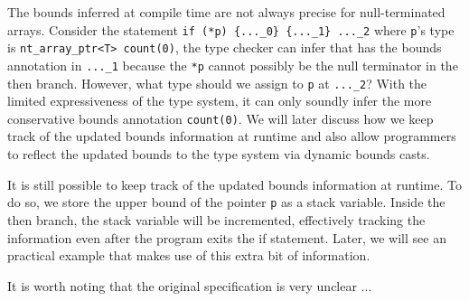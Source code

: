 
The bounds inferred at compile time are not always precise for null-terminated arrays.  Consider the statement \lstinline|if (*p) {..._0} {..._1} ..._2|
where \lstinline{p}'s type is \lstinline{nt_array_ptr<T> count(0)}, the type checker can infer that  has the bounds annotation  in \lstinline{..._1} because the \lstinline{*p} cannot possibly be the null terminator in the then branch. However, what type should we assign to \lstinline{p} at \lstinline{..._2}? With the limited expressiveness of the \checkedc type system, it can only soundly infer the more conservative bounds annotation \lstinline{count(0)}.
We will later discuss how we keep track of the updated bounds information at runtime and also allow programmers to reflect the updated bounds to the type system via dynamic bounds casts.


It is still possible to keep track of the updated bounds information at runtime.
To do so, we store the upper bound of the pointer \lstinline{p} as a stack variable. Inside the then branch, the stack variable will be incremented, effectively tracking the information even after the program exits the if statement. Later, we will see an practical example that makes use of this extra bit of information.

It is worth noting that the original \checkedc specification is very unclear ...

